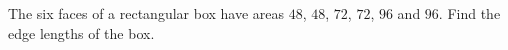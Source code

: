 The six faces of a rectangular box have areas $48$, $48$, $72$, $72$, $96$ and $96$. Find the edge lengths of the box.
